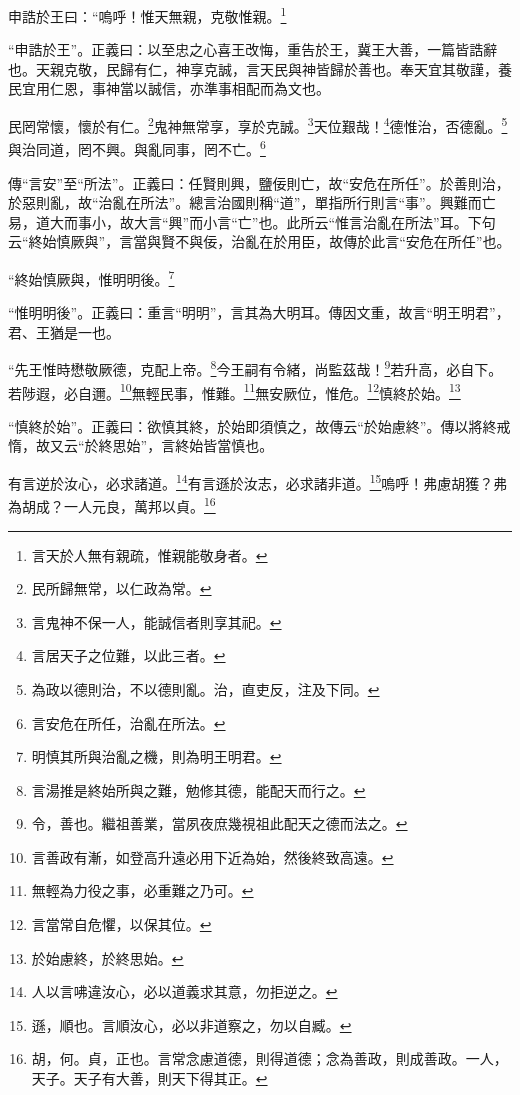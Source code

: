 申誥於王曰：“嗚呼！惟天無親，克敬惟親。\footnote{言天於人無有親疏，惟親能敬身者。}

{\noindent\shu{}\fzkt “申誥於王”。正義曰：以至忠之心喜王改悔，重告於王，冀王大善，一篇皆誥辭也。天親克敬，民歸有仁，神享克誠，言天民與神皆歸於善也。奉天宜其敬謹，養民宜用仁恩，事神當以誠信，亦準事相配而為文也。 \par}

民罔常懷，懷於有仁。\footnote{民所歸無常，以仁政為常。}鬼神無常享，享於克誠。\footnote{言鬼神不保一人，能誠信者則享其祀。}天位艱哉！\footnote{言居天子之位難，以此三者。}德惟治，否德亂。\footnote{為政以德則治，不以德則亂。治，直吏反，注及下同。}與治同道，罔不興。與亂同事，罔不亡。\footnote{言安危在所任，治亂在所法。}

{\noindent\zhuan{}\fzbyks 傳“言安”至“所法”。正義曰：任賢則興，鹽佞則亡，故“安危在所任”。於善則治，於惡則亂，故“治亂在所法”。總言治國則稱“道”，單指所行則言“事”。興難而亡易，道大而事小，故大言“興”而小言“亡”也。此所云“惟言治亂在所法”耳。下句云“終始慎厥與”，言當與賢不與佞，治亂在於用臣，故傳於此言“安危在所任”也。 \par}

“終始慎厥與，惟明明後。\footnote{明慎其所與治亂之機，則為明王明君。}

{\noindent\shu{}\fzkt “惟明明後”。正義曰：重言“明明”，言其為大明耳。傳因文重，故言“明王明君”，君、王猶是一也。 \par}

“先王惟時懋敬厥德，克配上帝。\footnote{言湯推是終始所與之難，勉修其德，能配天而行之。}今王嗣有令緒，尚監茲哉！\footnote{令，善也。繼祖善業，當夙夜庶幾視祖此配天之德而法之。}若升高，必自下。若陟遐，必自邇。\footnote{言善政有漸，如登高升遠必用下近為始，然後終致高遠。}無輕民事，惟難。\footnote{無輕為力役之事，必重難之乃可。}無安厥位，惟危。\footnote{言當常自危懼，以保其位。}慎終於始。\footnote{於始慮終，於終思始。}

{\noindent\shu{}\fzkt “慎終於始”。正義曰：欲慎其終，於始即須慎之，故傳云“於始慮終”。傳以將終戒惰，故又云“於終思始”，言終始皆當慎也。 \par}

有言逆於汝心，必求諸道。\footnote{人以言咈違汝心，必以道義求其意，勿拒逆之。}有言遜於汝志，必求諸非道。\footnote{遜，順也。言順汝心，必以非道察之，勿以自臧。}嗚呼！弗慮胡獲？弗為胡成？一人元良，萬邦以貞。\footnote{胡，何。貞，正也。言常念慮道德，則得道德；念為善政，則成善政。一人，天子。天子有大善，則天下得其正。}

